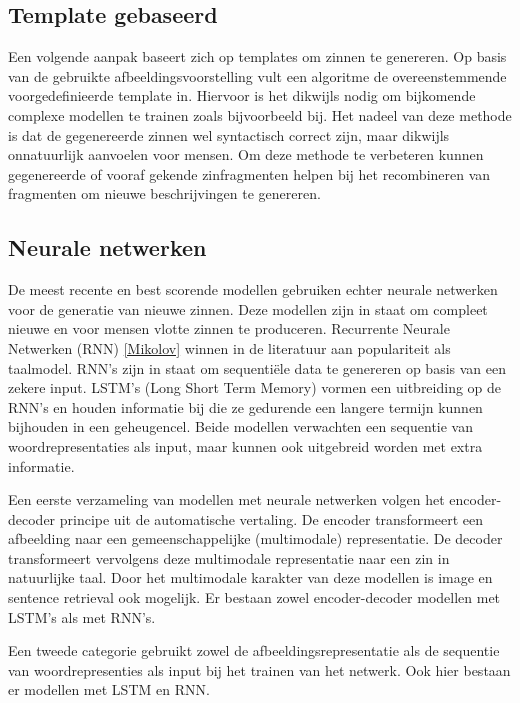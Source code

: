 \subsection{Template gebaseerd}
Een volgende aanpak baseert zich op templates om zinnen te genereren. Op basis van de gebruikte afbeeldingsvoorstelling vult een algoritme de overeenstemmende voorgedefinieerde template in.\cite{Yang2011} Hiervoor is het dikwijls nodig om bijkomende complexe modellen te trainen zoals bijvoorbeeld bij\cite{Elliott2013}. Het nadeel van deze methode is dat de gegenereerde zinnen wel syntactisch correct zijn, maar dikwijls onnatuurlijk aanvoelen voor mensen. Om deze methode te verbeteren kunnen gegenereerde of vooraf gekende zinfragmenten helpen bij het recombineren van fragmenten om nieuwe beschrijvingen te genereren. \cite{Mitchell2012}\cite{Kuznetsova2012}

\subsection{Neurale netwerken}
De meest recente en best scorende modellen gebruiken echter neurale netwerken voor de generatie van nieuwe zinnen. Deze modellen zijn in staat om compleet nieuwe en voor mensen vlotte zinnen te produceren. Recurrente Neurale Netwerken (RNN) \ref{Mikolov} winnen in de literatuur aan populariteit als taalmodel. RNN's zijn in staat om sequenti\"ele data te genereren op basis van een zekere input. LSTM's (Long Short Term Memory) vormen een uitbreiding op de RNN's en houden informatie bij die ze gedurende een langere termijn kunnen bijhouden in een geheugencel. Beide modellen verwachten een sequentie van woordrepresentaties als input, maar kunnen ook uitgebreid worden met extra informatie. \cite{Kiros}\cite{Xu}\cite{Socher} 

Een eerste verzameling van modellen met neurale netwerken volgen het encoder-decoder principe uit de automatische vertaling.\cite{Kiros} De encoder transformeert een afbeelding naar een gemeenschappelijke (multimodale) representatie. De decoder transformeert vervolgens deze multimodale representatie naar een zin in natuurlijke taal. Door het multimodale karakter van deze modellen is image en sentence retrieval ook mogelijk. Er bestaan zowel encoder-decoder modellen met LSTM's\cite{Kiros} als met RNN's\cite{Karpathy1}\cite{Mao}.

Een tweede categorie gebruikt zowel de afbeeldingsrepresentatie als de sequentie van 
woordrepresenties als input bij het trainen van het netwerk. Ook hier bestaan er modellen met LSTM \cite{Donahue,Vinyals} en RNN\cite{Karpathy}.

